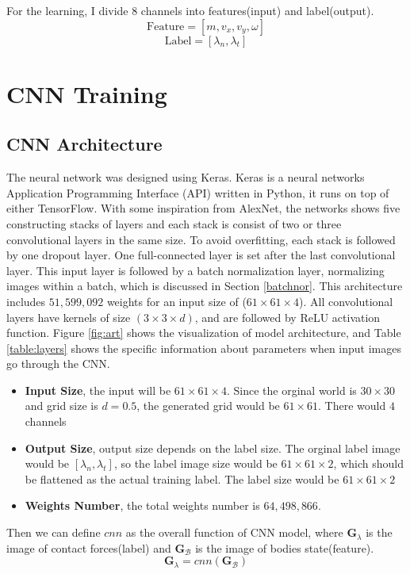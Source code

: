 For the learning, I divide 8 channels into features(input) and label(output).
    $$\text{Feature} = [m, v_x, v_y, \omega]$$
    $$\text{Label} = [\lambda_n, \lambda_t]$$


\section{CNN Training}
\subsection{CNN  Architecture}
    The neural network was designed using Keras\cite{chollet2015keras}. Keras is a neural networks Application Programming Interface (API) written in Python, it runs on top of either TensorFlow. With some inspiration from AlexNet\cite{Krizhevsky:2012:ICD:2999134.2999257}, the networks shows five constructing stacks of layers and each stack is consist of two or three convolutional layers in the same size. To avoid overfitting, each stack is followed by one dropout layer. One full-connected layer is set after the last convolutional layer. This input layer is followed by a batch normalization layer, normalizing images within a batch, which is discussed in Section \ref{batchnor}. This architecture includes $51,599,092$ weights for an input size of ($61\times61\times4$). All convolutional layers have kernels of size $(3\times 3\times d)$, and are followed by ReLU activation function. Figure \ref{fig:art} shows the visualization of model architecture, and Table \ref{table:layers} shows the specific information about parameters when input images go through the CNN.
    \begin{itemize}
        \item \textbf{Input Size}, the input will be $61\times61\times4$. Since the orginal world is $30\times30$ and grid size is $d=0.5$, the generated grid would be $61\times61$. There would $4$ channels
        \item \textbf{Output Size}, output size depends on the label size. The orginal label image would be $[\lambda_n, \lambda_t]$, so the label image size would be $61\times61\times2$, which should be flattened as the actual training label. The label size would be $61\times 61 \times 2$
        \item \textbf{Weights Number}, the total weights number is $64,498,866$. 
    \end{itemize}
    Then we can define $cnn$ as the overall function of CNN model, where $\pmb{G}_{\lambda}$ is the image of contact forces(label) and $\pmb{G}_{\mathcal{B}}$ is the image of bodies state(feature).
    \begin{equation}
        \pmb{G}_{\lambda} = cnn(\pmb{G}_{\mathcal{B}})
    \end{equation}

